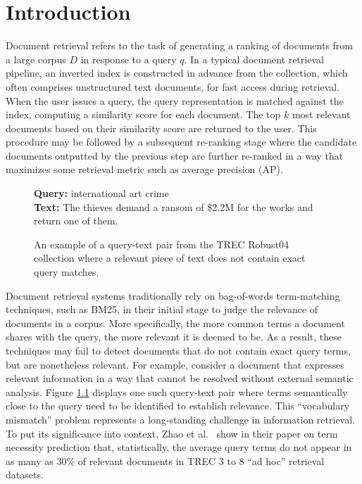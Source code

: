 \chapter{Introduction}
\label{intro}

Document retrieval refers to the task of generating a ranking of documents from a large corpus $ D $ in response to a query $ q $.
In a typical document retrieval pipeline, an inverted index is constructed in advance from the collection, which often comprises unstructured text documents, for fast access during retrieval.
When the user issues a query, the query representation is matched against the index, computing a similarity score for each document.
The top $ k $ most relevant documents based on their similarity score are returned to the user.
This procedure may be followed by a subsequent re-ranking stage where the candidate documents outputted by the previous step are further re-ranked in a way that maximizes some retrieval metric such as average precision (AP).

\begin{figure}[b!]
	\begin{framed}
    		\textbf{Query:} international art crime \\
    		\textbf{Text:} The thieves demand a ransom of \$2.2M for the works and return one of them.
	\end{framed}
\label{query-sent-example}
 \caption{An example of a query-text pair from the TREC Robust04 collection where a relevant piece of text does not contain exact query matches.}
\end{figure}

Document retrieval systems traditionally rely on bag-of-words term-matching techniques, such as BM25, in their initial stage to judge the relevance of documents in a corpus.
More specifically, the more common terms a document shares with the query, the more relevant it is deemed to be.
As a result, these techniques may fail to detect documents that do not contain exact query terms, but are nonetheless relevant.
For example, consider a document that expresses relevant information in a way that cannot be resolved without external semantic analysis.
Figure \ref{query-sent-example} displays one such query-text pair where terms semantically close to the query need to be identified to establish relevance.
This ``vocabulary mismatch'' problem represents a long-standing challenge in information retrieval.
To put its significance into context, Zhao et al.~\cite{zhao2010term} show in their paper on term necessity prediction that, statistically, the average query terms do not appear in as many as 30\% of relevant documents in TREC 3 to 8 ``ad hoc'' retrieval datasets.

